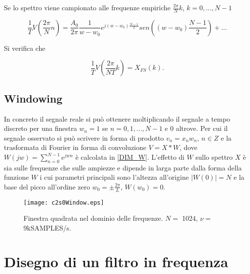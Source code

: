 Se lo spettro viene campionato alle frequenze empiriche $\frac{2\pi}{N} k$, $k=0,..., N-1$

\begin{equation}
\frac{1}{T}V(\frac{2\pi}{N}n) = \frac{A_{0}}{2\pi}\frac{1}{ w-w_{0} }
e^{j(w-w_{0})\frac{N-1}{2}} sen( (w-w_{0}) \frac{N-1}{2} ) + ...
\end{equation}

Si verifica che

\begin{equation}
\frac{1}{T} V(\frac{2\pi}{NT}k) = X_{FS}(k).
\end{equation}



\subsection{Windowing}

In concreto il segnale reale si può ottenere moltiplicando il segnale a tempo discreto per una finestra $w_{n}=1$ se $n=0,1,...,N-1$ e $0$ altrove. Per cui il segnale osservato si può scrivere in forma di prodotto
$v_{n} = x_{n}w_{n}$, $n\in Z$
e la trasformata di Fourier in forma di convoluzione
$V = X*W$, dove $W(jw) = \sum_{n=0}^{N-1} e^{jwn}$ è calcolata in \ref{DIM_W}.
L'effetto di $W$ sullo spettro $X$ è sia sulle frequenze che sulle ampiezze e dipende in larga parte dalla forma della funzione $W$ i cui parametri principali sono l'altezza all'origine $|W(0)| = N$ e la base del picco all'ordine zero
$w_{0} = \pm\frac{2\pi}{L}$, $W(w_{0}) = 0$.


\begin{figure}[tbp] 
\centering    
\texttt{[image: c2s0Window.eps]}
\caption{Finestra quadrata nel dominio delle frequenze. $N=$ 1024, $\nu=$ 9kSAMPLES/s.}
\label{fig:c2s0Window}
\end{figure}




\section{Disegno di un filtro in frequenza}

